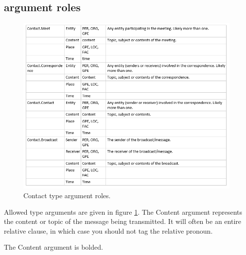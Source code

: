 \subsection{ argument roles}

\begin{figure}[t]
\centering
\includegraphics[width=\textwidth]{img/contact_type_args.png}
\caption{Contact type argument roles.}
\label{fig:contact_type_args.png}
\end{figure}

Allowed  type arguments are given in figure \ref{fig:contact_type_args.png}. The Content argument represents the content or topic of the message being transmitted. It will often be an entire relative clause, in which case you should not tag the relative pronoun.

\begin{exe}
    
    \ex {} 
        \expl {} The Content argument is bolded.
    
    \ex {}
        
    \ex {}

\end{exe}






